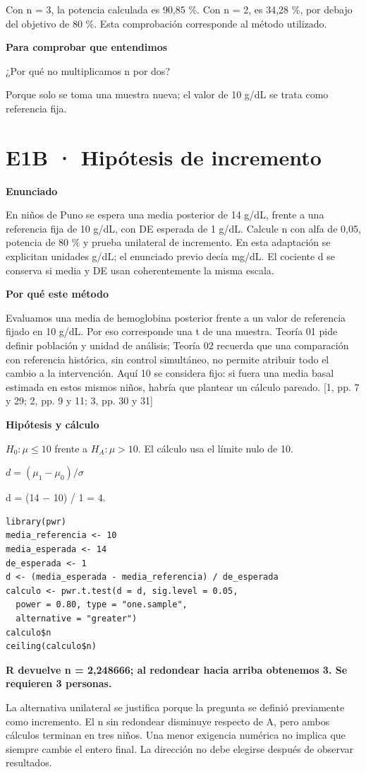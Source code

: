 \documentclass[10pt,a4paper]{article}
\newcommand{\etiqueta}[1]{\par{\bfseries\color{Blue}#1}\par}
\newcommand{\cajares}[1]{\par\colorbox{Pale}{\parbox{\dimexpr\linewidth-2\fboxsep}{\vspace{4pt}\textbf{\color{Navy}#1}\vspace{4pt}}}\par}
\begin{document}
{\small\color{Gray}Con n = 3, la potencia calculada es 90,85 \%. Con n = 2, es 34,28 \%, por debajo del objetivo de 80 \%. Esta comprobación corresponde al método utilizado.}
\etiqueta{Para comprobar que entendimos}
¿Por qué no multiplicamos n por dos?

{\small Porque solo se toma una muestra nueva; el valor de 10 g/dL se trata como referencia fija.}
\clearpage
\section*{E1B · Hipótesis de incremento}
\etiqueta{Enunciado}
En niños de Puno se espera una media posterior de 14 g/dL, frente a una referencia fija de 10 g/dL, con DE esperada de 1 g/dL. Calcule n con alfa de 0,05, potencia de 80 \% y prueba unilateral de incremento. En esta adaptación se explicitan unidades g/dL; el enunciado previo decía mg/dL. El cociente d se conserva si media y DE usan coherentemente la misma escala.
\etiqueta{Por qué este método}
Evaluamos una media de hemoglobina posterior frente a un valor de referencia fijado en 10 g/dL. Por eso corresponde una t de una muestra. Teoría 01 pide definir población y unidad de análisis; Teoría 02 recuerda que una comparación con referencia histórica, sin control simultáneo, no permite atribuir todo el cambio a la intervención. Aquí 10 se considera fijo: si fuera una media basal estimada en estos mismos niños, habría que plantear un cálculo pareado. [1, pp. 7 y 29; 2, pp. 9 y 11; 3, pp. 30 y 31]
\etiqueta{Hipótesis y cálculo}
$H_0: \mu\le10$ frente a $H_A: \mu>10$. El cálculo usa el límite nulo de 10.

$d=(\mu_1-\mu_0)/\sigma$

d = (14 \ensuremath{-} 10) / 1 = 4.
\begin{Verbatim}
library(pwr)
media_referencia <- 10
media_esperada <- 14
de_esperada <- 1
d <- (media_esperada - media_referencia) / de_esperada
calculo <- pwr.t.test(d = d, sig.level = 0.05,
  power = 0.80, type = "one.sample",
  alternative = "greater")
calculo$n
ceiling(calculo$n)
\end{Verbatim}
\cajares{R devuelve n = 2,248666; al redondear hacia arriba obtenemos 3. Se requieren 3 personas.}
La alternativa unilateral se justifica porque la pregunta se definió previamente como incremento. El n sin redondear disminuye respecto de A, pero ambos cálculos terminan en tres niños. Una menor exigencia numérica no implica que siempre cambie el entero final. La dirección no debe elegirse después de observar resultados.
\end{document}
